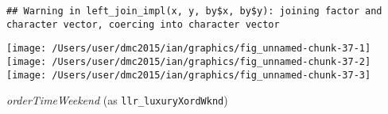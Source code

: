 \documentclass[10pt]{report}
\newenvironment{Shaded}{}{}
\newcommand{\KeywordTok}[1]{\textcolor[rgb]{0.00,0.44,0.13}{\textbf{{#1}}}}
\newcommand{\DataTypeTok}[1]{\textcolor[rgb]{0.56,0.13,0.00}{{#1}}}
\newcommand{\StringTok}[1]{\textcolor[rgb]{0.25,0.44,0.63}{{#1}}}
\newcommand{\NormalTok}[1]{{#1}}
\begin{document}
\begin{Shaded}
\end{Shaded}

\begin{verbatim}
## Warning in left_join_impl(x, y, by$x, by$y): joining factor and character vector, coercing into character vector
\end{verbatim}

\begin{Shaded}
\end{Shaded}

\begin{center}\texttt{[image: /Users/user/dmc2015/ian/graphics/fig\_unnamed-chunk-37-1]} \texttt{[image: /Users/user/dmc2015/ian/graphics/fig\_unnamed-chunk-37-2]} \texttt{[image: /Users/user/dmc2015/ian/graphics/fig\_unnamed-chunk-37-3]} \end{center}

\emph{orderTimeWeekend} (as \texttt{llr\_luxuryXordWknd})
\end{document}
